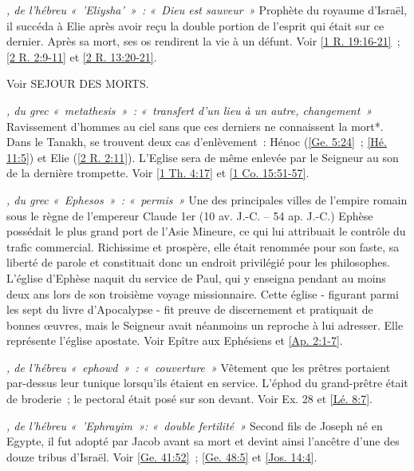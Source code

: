 \begin{multicols}{2}
\textit{, de l'hébreu «~'Eliysha'~»~: «~Dieu est sauveur~»}\newline
Prophète du royaume d'Israël, il succéda à Elie après avoir reçu la double portion de l'esprit qui était sur ce dernier. Après sa mort, ses os rendirent la vie à un défunt. Voir \vref{1 R. 19:16-21}~; \vref{2 R. 2:9-11} et \vref{2 R. 13:20-21}.

\textit{}\newline
Voir SEJOUR DES MORTS.

\textit{, du grec «~metathesis~»~: «~transfert d'un lieu à un autre, changement~»}\newline
Ravissement d'hommes au ciel sans que ces derniers ne connaissent la mort*. Dans le Tanakh, se trouvent deux cas d'enlèvement~: Hénoc (\vref{Ge. 5:24}~; \vref{Hé. 11:5}) et Elie (\vref{2 R. 2:11}). L'Eglise sera de même enlevée par le Seigneur au son de la dernière trompette. Voir \vref{1 Th. 4:17} et \vref{1 Co. 15:51-57}.

\textit{, du grec «~Ephesos~»~: «~permis~»}\newline
Une des principales villes de l'empire romain sous le règne de l'empereur Claude 1er (10 av. J.-C. – 54 ap. J.-C.) Ephèse possédait le plus grand port de l'Asie Mineure, ce qui lui attribuait le contrôle du trafic commercial. Richissime et prospère, elle était renommée pour son faste, sa liberté de parole et constituait donc un endroit privilégié pour les philosophes. L'église d'Ephèse naquit du service de Paul, qui y enseigna pendant au moins deux ans lors de son troisième voyage missionnaire. Cette église - figurant parmi les sept du livre d'Apocalypse - fit preuve de discernement et pratiquait de bonnes œuvres, mais le Seigneur avait néanmoins un reproche à lui adresser. Elle représente l'église apostate. Voir Epître aux Ephésiens et \vref{Ap. 2:1-7}.

\textit{, de l'hébreu «~ephowd~»~: «~couverture~»}\newline
Vêtement que les prêtres portaient par-dessus leur tunique lorsqu'ils étaient en service. L'éphod du grand-prêtre était de broderie~; le pectoral était posé sur son devant. Voir Ex. 28 et \vref{Lé. 8:7}.

\textit{, de l'hébreu «~'Ephrayim~»: «~double fertilité~»}\newline
Second fils de Joseph né en Egypte, il fut adopté par Jacob avant sa mort et devint ainsi l'ancêtre d'une des douze tribus d'Israël. Voir \vref{Ge. 41:52}~; \vref{Ge. 48:5} et \vref{Jos. 14:4}.


\end{multicols}
